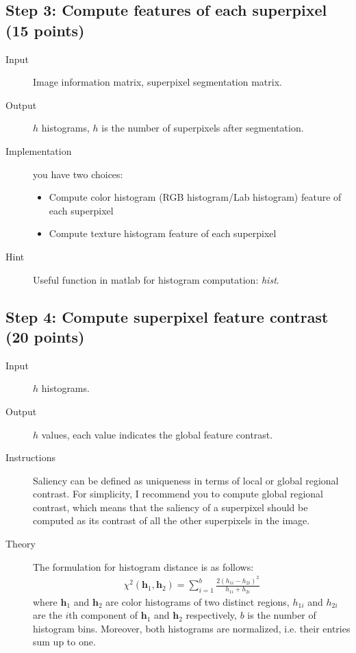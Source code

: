 \documentclass[12pt]{article}
\begin{document}
\subsection{Step 3: Compute features of each superpixel (15 points)}

\begin{description}
\item[Input] Image information matrix, superpixel segmentation matrix. 
\item[Output] $h$ histograms, $h$ is the number of superpixels after segmentation.
\item[Implementation] you have two choices:
\begin{itemize}
\item Compute color histogram (RGB histogram/Lab histogram) feature of each superpixel
\item Compute texture histogram feature of each superpixel
\end{itemize}
\item[Hint] Useful function in matlab for histogram computation: \emph{hist}.
\end{description}

\subsection{Step 4: Compute superpixel feature contrast (20 points)}

\begin{description}
\item[Input] $h$ histograms.
\item[Output] $h$ values, each value indicates the global feature contrast.
\item[Instructions] Saliency can be defined as uniqueness in terms of local or global regional contrast. For simplicity, I recommend you to compute global regional contrast, which means that the saliency of a superpixel should be computed as its contrast of all the other superpixels in the image. 
\item[Theory] The formulation for histogram distance is as follows:
\begin{align}
\chi^2(\textbf{h}_1, \textbf{h}_2) = \sum_{i=1}^{b}\frac{2(h_{1i}-h_{2i})^2}{h_{1i}+h_{2i}}
\end{align}
where $\textbf{h}_1$ and $\textbf{h}_2$ are color histograms of two distinct regions,  $h_{1i}$ and $h_{2i}$ are the $i$th component of $\textbf{h}_1$ and $\textbf{h}_2$ respectively, $b$ is the number of histogram bins. Moreover, both histograms are normalized, i.e. their entries sum up to one.
\end{description}
\end{document}

